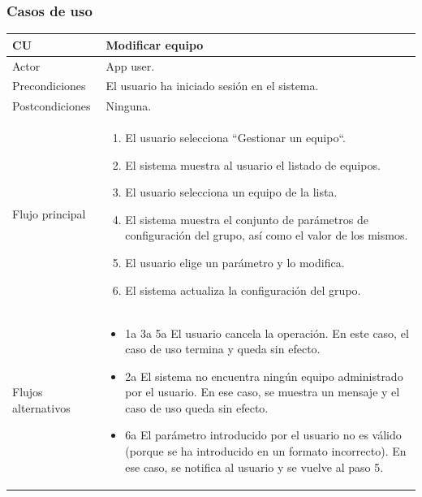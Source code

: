 \documentclass[twoside]{report}
\newcommand\addrow[2]{#1 &#2\\ }
\newcommand\addheading[2]{#1 &#2\\ \hline}
\newcommand\tabularhead{\begin{tabular}{lp{0.7\textwidth}}
\hline
}
\newenvironment{usecase}{\tabularhead}
{\hline\end{tabular}}
\begin{document}
\subsubsection{Casos de uso}



\begin{usecase}
  \addheading{\textbf{CU\arabic{usecase}}}{Modificar equipo} 
  \addrow{Actor}{App user.}
  \addrow{Precondiciones}{El usuario ha iniciado sesión en el sistema.}
  \addrow{Postcondiciones}{Ninguna.}
  \addrow{Flujo principal}{
  		\begin{enumerate}
  		\item El usuario selecciona “Gestionar un equipo“. %
        \item El sistema muestra al usuario el listado de equipos. %
        \item El usuario selecciona un equipo de la lista. %
        \item El sistema muestra el conjunto de parámetros de configuración del grupo, así como el valor de los mismos. %
        \item El usuario elige un parámetro y lo modifica. %
        \item El sistema actualiza la configuración del grupo. %
  		\end{enumerate}
  }
  \addrow{Flujos alternativos}{
  		\begin{itemize}
  		\item 1a 3a 5a El usuario cancela la operación. En este caso, el caso de uso termina y queda sin efecto.
  		\item 2a El sistema no encuentra ningún equipo administrado por el usuario. En ese caso, se muestra un mensaje y el caso de uso queda sin efecto.
  		\item 6a El parámetro introducido por el usuario no es válido (porque se ha introducido en un formato incorrecto). En ese caso, se notifica al usuario y se vuelve al paso 5.
  		\end{itemize}
  }
\end{usecase}\\
\end{document}
